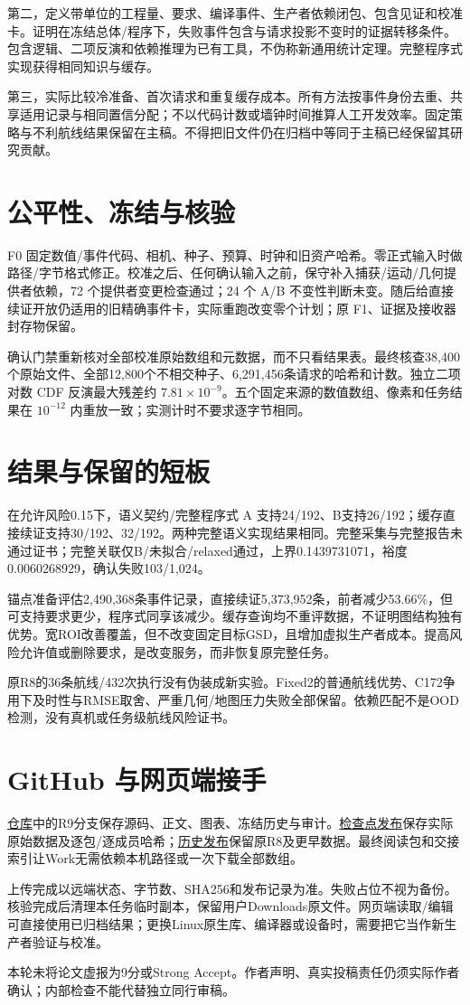 \documentclass[UTF8,a4paper,11pt,fontset=fandol]{ctexart}
\begin{document}
第二，定义带单位的工程量、要求、编译事件、生产者依赖闭包、包含见证和校准卡。证明在冻结总体/程序下，失败事件包含与请求投影不变时的证据转移条件。包含逻辑、二项反演和依赖推理为已有工具，不伪称新通用统计定理。完整程序式实现获得相同知识与缓存。

第三，实际比较冷准备、首次请求和重复缓存成本。所有方法按事件身份去重、共享适用记录与相同置信分配；不以代码计数或墙钟时间推算人工开发效率。固定策略与不利航线结果保留在主稿。不得把旧文件仍在归档中等同于主稿已经保留其研究贡献。

\section{公平性、冻结与核验}
F0 固定数值/事件代码、相机、种子、预算、时钟和旧资产哈希。零正式输入时做路径/字节格式修正。校准之后、任何确认输入之前，保守补入捕获/运动/几何提供者依赖，72 个提供者变更检查通过；24 个 A/B 不变性判断未变。随后给直接续证开放仍适用的旧精确事件卡，实际重跑改变零个计划；原 F1、证据及接收器封存物保留。

确认门禁重新核对全部校准原始数组和元数据，而不只看结果表。最终核查38,400个原始文件、全部12,800个不相交种子、6,291,456条请求的哈希和计数。独立二项对数 CDF 反演最大残差约 $7.81\times10^{-9}$。五个固定来源的数值数组、像素和任务结果在 $10^{-12}$ 内重放一致；实测计时不要求逐字节相同。

\section{结果与保留的短板}
在允许风险0.15下，语义契约/完整程序式 A 支持24/192、B支持26/192；缓存直接续证支持30/192、32/192。两种完整语义实现结果相同。完整采集与完整报告未通过证书；完整关联仅B/未拟合/relaxed通过，上界0.1439731071，裕度0.0060268929，确认失败103/1,024。

锚点准备评估2,490,368条事件记录，直接续证5,373,952条，前者减少53.66\%，但可支持要求更少，程序式同享该减少。缓存查询均不重评数据，不证明图结构独有优势。宽ROI改善覆盖，但不改变固定目标GSD，且增加虚拟生产者成本。提高风险允许值或删除要求，是改变服务，而非恢复原完整任务。

原R8的36条航线/432次执行没有伪装成新实验。Fixed2的普通航线优势、C172争用下及时性与RMSE取舍、严重几何/地图压力失败全部保留。依赖匹配不是OOD检测，没有真机或任务级航线风险证书。

\section{GitHub 与网页端接手}
\href{https://github.com/edrisskrah131-lang/A20-AEI-R8}{仓库}中的R9分支保存源码、正文、图表、冻结历史与审计。\href{https://github.com/edrisskrah131-lang/A20-AEI-R8/releases/tag/r9-checkpoints-20261012}{检查点发布}保存实际原始数据及逐包/逐成员哈希；\href{https://github.com/edrisskrah131-lang/A20-AEI-R8/releases/tag/r8-handoff-2026-10-12}{历史发布}保留原R8及更早数据。最终阅读包和交接索引让Work无需依赖本机路径或一次下载全部数组。

上传完成以远端状态、字节数、SHA256和发布记录为准。失败占位不视为备份。核验完成后清理本任务临时副本，保留用户Downloads原文件。网页端读取/编辑可直接使用已归档结果；更换Linux原生库、编译器或设备时，需要把它当作新生产者验证与校准。

本轮未将论文虚报为9分或Strong Accept。作者声明、真实投稿责任仍须实际作者确认；内部检查不能代替独立同行审稿。
\end{document}
